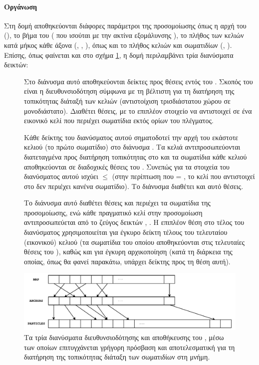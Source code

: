 \paragraph{Οργάνωση} Στη δομή  αποθηκεύονται διάφορες παράμετροι της
προσομοίωσης όπως η αρχή του (), το βήμα του ( που ισούται με την
ακτίνα εξομάλυνσης ), το πλήθος των κελιών κατά μήκος κάθε άξονα
(, , ), όπως και το πλήθος κελιών και σωματιδίων (,
). Επίσης, όπως φαίνεται και στο σχήμα \ref{fig:lp-grid}, η δομή
περιλαμβάνει τρία διανύσματα δεικτών:
\begin{description}
\item[] Στο διάνυσμα αυτό αποθηκεύονται δείκτες προς θέσεις εντός του
  . Σκοπός του  είναι η διευθυνσιοδότηση σύμφωνα με τη βέλτιστη για
  τη διατήρηση της τοπικότητας διάταξή των κελιών (αντιστοίχιση τρισδιάστατου χώρου σε
  μονοδιάστατο). Διαθέτει  θέσεις, με το επιπλέον στοιχείο να
  αντιστοιχεί σε ένα εικονικό κελί που περιέχει σωματίδια εκτός ορίων του πλέγματος.
\item[] Κάθε δείκτης του διανύσματος αυτού σηματοδοτεί την αρχή του εκάστοτε
  κελιού (το πρώτο σωματίδιο) στο διάνυσμα . Τα κελιά αντιπροσωπεύονται
  διατεταγμένα προς διατήρηση τοπικότητας στο  και τα σωματίδια κάθε κελιού
  αποθηκεύονται σε διαδοχικές θέσεις του . Συνεπώς για τα στοιχεία του
  διανύσματος αυτού ισχύει  $\leq$
   (στην περίπτωση που  = , το κελί που αντιστοιχεί στο
   δεν περιέχει κανένα σωματίδιο). Το διάνυσμα διαθέτει και αυτό
   θέσεις.
\item[] Το διάνυσμα αυτό διαθέτει  θέσεις και
  περιέχει τα σωματίδια της προσομοίωσης, ενώ κάθε πραγματικό κελί  στην
  προσομοίωση αντιπροσωπεύεται από το ζεύγος δεικτών , . Η επιπλέον
  θέση στο τέλος του διανύσματος χρησιμοποιείται για έγκυρο δείκτη τέλους του τελευταίου
  (εικονικού) κελιού (τα σωματίδια του οποίου αποθηκεύονται στις τελευταίες θέσεις του
  ), καθώς και για έγκυρη αρχικοποίηση (κατά τη διάρκεια της οποίας, όπως
  θα φανεί παρακάτω, υπάρχει δείκτης προς τη θέση αυτή).
\end{description}
\begin{figure}[h]
  \centering
  \includegraphics[width=\textwidth]{figures/lp-grid.pdf}
  \caption[Διανύσματα οργάνωσης του ] {Τα τρία διανύσματα διευθυνσιοδότησης
    και αποθήκευσης του , μέσω των οποίων επιτυγχάνεται γρήγορη πρόσβαση και
    αποτελεσματική για τη διατήρηση της τοπικότητας διάταξη των σωματιδίων στη μνήμη.}
  \label{fig:lp-grid}
\end{figure}

